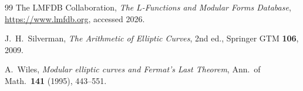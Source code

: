 \documentclass[12pt,a4paper]{article}
\theoremstyle{remark}
\begin{document}
\begin{thebibliography}{99}
The LMFDB Collaboration,
\textit{The $L$-Functions and Modular Forms Database},
\url{https://www.lmfdb.org}, accessed 2026.

J.~H.~Silverman,
\textit{The Arithmetic of Elliptic Curves},
2nd ed., Springer GTM \textbf{106}, 2009.

A.~Wiles,
\textit{Modular elliptic curves and Fermat's Last Theorem},
Ann.\ of Math.\ \textbf{141} (1995), 443--551.

\end{thebibliography}
\end{document}
